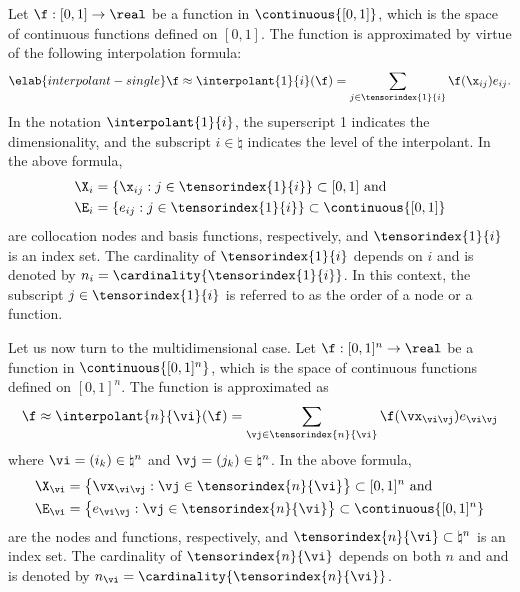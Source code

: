Let $\f: [0, 1] \to \real$ be a function in $\continuous{[0, 1]}$, which is the
space of continuous functions defined on $[0, 1]$. The function is approximated
by virtue of the following interpolation formula:
\begin{equation} \elab{interpolant-single}
  \f \approx \interpolant{1}{i}(\f)
  = \sum_{j \in \tensorindex{1}{i}} \f(\x_{ij}) e_{ij}.
\end{equation}
In the notation $\interpolant{1}{i}$, the superscript 1 indicates the
dimensionality, and the subscript $i \in \natural$ indicates the level of the
interpolant. In the above formula,
\begin{align*}
  & \X_i = \{ \x_{ij}: j \in \tensorindex{1}{i} \} \subset [0, 1] \text{ and} \\
  & \E_i = \{ e_{ij}: j \in \tensorindex{1}{i} \} \subset \continuous{[0, 1]}
\end{align*}
are collocation nodes and basis functions, respectively, and
$\tensorindex{1}{i}$ is an index set. The cardinality of $\tensorindex{1}{i}$
depends on $i$ and is denoted by $n_i = \cardinality{\tensorindex{1}{i}}$. In
this context, the subscript $j \in \tensorindex{1}{i}$ is referred to as the
order of a node or a function.

Let us now turn to the multidimensional case. Let $\f: [0, 1]^n \to \real$ be a
function in $\continuous{[0, 1]^n}$, which is the space of continuous functions
defined on $[0, 1]^n$. The function is approximated as
\[
  \f \approx \interpolant{n}{\vi}(\f)
  = \sum_{\vj \in \tensorindex{n}{\vi}} \f(\vx_{\vi \vj}) e_{\vi \vj}
\]
where $\vi = (i_k) \in \natural^n$ and $\vj = (j_k) \in \natural^n$. In the
above formula,
\begin{align*}
  & \X_{\vi} = \left\{ \vx_{\vi \vj}: \vj \in \tensorindex{n}{\vi} \right\} \subset [0, 1]^n \text{ and} \\
  & \E_{\vi} = \left\{ e_{\vi \vj}: \vj \in \tensorindex{n}{\vi} \right\} \subset \continuous{[0, 1]^n}
\end{align*}
are the nodes and functions, respectively, and $\tensorindex{n}{\vi} \subset
\natural^n$ is an index set. The cardinality of $\tensorindex{n}{\vi}$ depends
on both $n$ and \vi and is denoted by $n_{\vi} =
\cardinality{\tensorindex{n}{\vi}}$.

